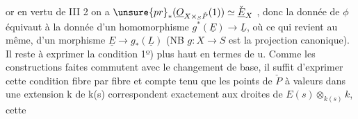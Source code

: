  or en vertu de III 2 on a $\unsure{pr}_*(\underline{O}_{X\times_S\check{P}}(1))\simeq\check{\underline{E}}_X$ , donc
la donnée de $\phi$ équivaut à  la donnée d'un homomorphisme $g^*(\underline{E})\to\underline{L}$,
où ce qui revient au même, d'un morphisme  $\underline{E}\to g_*(\underline{L})$ (NB $g:X\to S$ est
la projection canonique). Il reste à exprimer la condition 1º) plus
haut en termes de u. Comme les constructions faites commutent avec le
changement de base, il suffit d'exprimer cette condition fibre par fibre\hand{,}
et compte tenu que les points de $\check{P}$ à valeurs dans une extension k de
k(s) correspondent exactement aux droites de $E(s)\otimes_{k(s)}k$, cette

